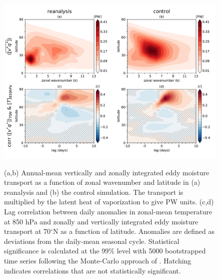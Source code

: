 \documentclass[draft]{agujournal2019}
\begin{document}
\newpage
\begin{figure}[ht]
  \noindent\includegraphics[trim=0cm 0cm 0cm 0cm, clip=true,scale=0.5]{./fig_02.pdf}\\
  \caption{(a,b) Annual-mean vertically and zonally integrated eddy moisture transport as a function of zonal wavenumber and latitude in (a) reanalysis and (b) the control simulation. The transport is multiplied by the latent heat of vaporization to give PW units. (c,d) Lag correlation between daily anomalies in zonal-mean temperature at 850 hPa and zonally and vertically integrated eddy moisture transport at 70$^{\circ}$N as a function of latitude. Anomalies are defined as deviations from the daily-mean seasonal cycle. Statistical significance is calculated at the 99$\%$ level with 5000 bootstrapped time series following the Monte-Carlo approach of . Hatching indicates correlations that are not statistically significant.}\label{f2}
\end{figure}
\end{document}

